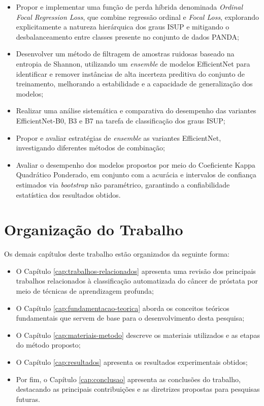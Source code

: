 \begin{itemize}
	\item Propor e implementar uma função de perda híbrida denominada \textit{Ordinal Focal Regression Loss}, que combine regressão ordinal e \textit{Focal Loss}, explorando explicitamente a natureza hierárquica dos graus ISUP e mitigando o desbalanceamento entre classes presente no conjunto de dados PANDA;
	\item Desenvolver um método de filtragem de amostras ruidosas baseado na entropia de Shannon, utilizando um \textit{ensemble} de modelos EfficientNet para identificar e remover instâncias de alta incerteza preditiva do conjunto de treinamento, melhorando a estabilidade e a capacidade de generalização dos modelos;
	\item Realizar uma análise sistemática e comparativa do desempenho das variantes EfficientNet-B0, B3 e B7 na tarefa de classificação dos graus ISUP;
	\item Propor e avaliar estratégias de \textit{ensemble} as variantes EfficientNet, investigando diferentes métodos de combinação;
	
	\item Avaliar o desempenho dos modelos propostos por meio do Coeficiente Kappa Quadrático Ponderado, em conjunto com a acurácia e intervalos de confiança estimados via \textit{bootstrap} não paramétrico, garantindo a confiabilidade 
	estatística dos resultados obtidos.
\end{itemize}

\section{Organização do Trabalho}
\label{sec:organizacao-do-trabalho}

Os demais capítulos deste trabalho estão organizados da seguinte forma:

\begin{itemize}
	\item O Capítulo \ref{cap:trabalhos-relacionados} apresenta uma revisão dos principais trabalhos relacionados à classificação automatizada do câncer de próstata por meio de técnicas de aprendizagem profunda;
	
	\item O Capítulo \ref{cap:fundamentacao-teorica} aborda os conceitos teóricos fundamentais que servem de base para o desenvolvimento desta pesquisa;
	
	\item O Capítulo \ref{cap:materiais-metodo} descreve os materiais utilizados e as etapas do método proposto;
	
	\item O Capítulo \ref{cap:resultados} apresenta os resultados experimentais obtidos;
	
	\item Por fim, o Capítulo \ref{cap:conclusao} apresenta as conclusões do trabalho, destacando as principais contribuições e as diretrizes propostas para pesquisas futuras.
\end{itemize}